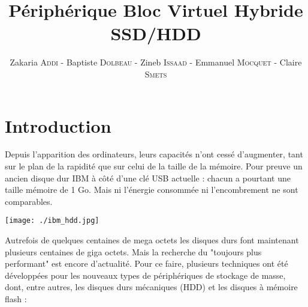 \documentclass[a4paper,10pt]{article}
\title{Périphérique Bloc Virtuel Hybride SSD/HDD}
\author{Zakaria {\scshape{Addi}} - Baptiste {\scshape{Dolbeau}} - Zineb {\scshape{Issaad}} - Emmanuel {\scshape{Mocquet}} - Claire {\scshape{Smets}}}
\begin{document}
\maketitle

\clearpage
\tableofcontents
\clearpage

\pagebreak
\section{Introduction}
\begin{minipage}{0.55\linewidth}
Depuis l'apparition des ordinateurs, leurs capacités n'ont cessé d'augmenter, tant
sur le plan de la rapidité que sur celui de la taille de la mémoire. Pour preuve
un ancien disque dur IBM à côté d'une clé USB actuelle : chacun a pourtant une 
taille mémoire de 1 Go. Mais ni l'énergie consommée ni l'encombrement ne sont comparables.\\
\end{minipage}\hfill
\begin{minipage}{0.4\linewidth}
\texttt{[image: ./ibm\_hdd.jpg]}
\end{minipage}
Autrefois de quelques centaines de mega octets les disques durs font maintenant 
plusieurs centaines de giga octets. Mais la recherche du "toujours plus performant"
est encore d'actualité. Pour ce faire, plusieurs techniques ont été développées 
pour les nouveaux types de périphériques de stockage de masse, dont, entre autres,
les disques durs mécaniques (HDD) et les disques à mémoire flash : \bigskip\\
\end{document}
